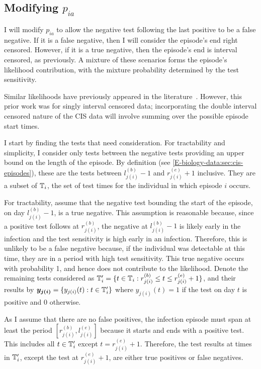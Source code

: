 \documentclass[thesis.tex]{subfiles}
\begin{document}
\subsection{Modifying \texorpdfstring{$p_{ia}$}{pia}} \label{imperf-test:sec:modifying-p_ia}

I will modify $p_{ia}$ to allow the negative test following the last positive to be a false negative.
If it is a false negative, then I will consider the episode's end right censored.
However, if it is a true negative, then the episode's end is interval censored, as previously.
A mixture of these scenarios forms the episode's likelihood contribution, with the mixture probability determined by the test sensitivity.

Similar likelihoods have previously appeared in the literature~\autocite[e.g.][eq.\ (2)]{piresIntervalMisclassify}.
However, this prior work was for singly interval censored data; incorporating the double interval censored nature of the CIS data will involve summing over the possible episode start times.

I start by finding the tests that need consideration.
For tractability and simplicity, I consider only tests between the negative tests providing an upper bound on the length of the episode.
By definition (see \cref{E-biology-data:sec:cis-episodes}), these are the tests between $l_{j(i)}^{(b)} - 1$ and $r_{j(i)}^{(e)} + 1$ inclusive.
They are a subset of $\mathbb{T}_i$, the set of test times for the individual in which episode $i$ occurs.

For tractability, assume that the negative test bounding the start of the episode, on day $l_{j(i)}^{(b)}-1$, is a true negative.
This assumption is reasonable because, since a positive test follows at $r_{j(i)}^{(b)}$, the negative at $l_{j(i)}^{(b)}-1$ is likely early in the infection and the test sensitivity is high early in an infection.
Therefore, this is unlikely to be a false negative because, if the individual was detectable at this time, they are in a period with high test sensitivity.
This true negative occurs with probability 1, and hence does not contribute to the likelihood.
Denote the remaining tests considered as $\mathbb{T}'_i = \{ t \in \mathbb{T}_i : r_{j(i)}^{(b)} \leq t \leq r_{j(i)}^{(e)} + 1 \}$, and their results by $\bm{y_{j(i)}} = \{ y_{j(i)}(t) : t \in \mathbb{T}'_i \}$ where $y_{j(i)}(t) = 1$ if the test on day $t$ is positive and 0 otherwise.

As I assume that there are no false positives, the infection episode must span at least the period $[r^{(b)}_{j(i)}, l^{(e)}_{j(i)}]$ because it starts and ends with a positive test.
This includes all $t \in \mathbb{T}'_i$ except $t = r_{j(i)}^{(e)}+1$.
Therefore, the test results at times in $\mathbb{T}_i'$, except the test at $r_{j(i)}^{(e)}+1$, are either true positives or false negatives.
\end{document}
